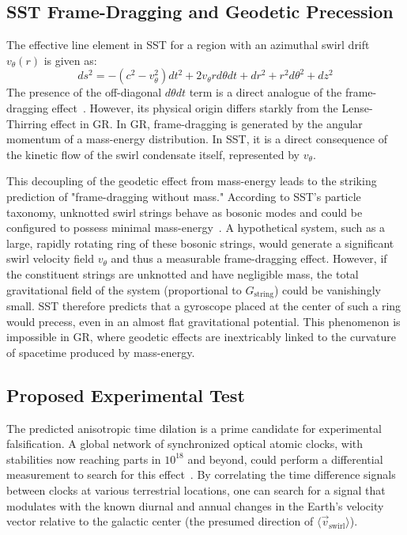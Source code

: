 \documentclass[11pt, a4paper]{article}
\begin{document}
    \subsection{SST Frame-Dragging and Geodetic Precession}

        The effective line element in SST for a region with an azimuthal swirl drift $v_{\theta}(r)$ is given as:
        \begin{equation}
        ds^{2}=-(c^{2}-v_{\theta}^{2})dt^{2}+2 v_{\theta}r d\theta dt+dr^{2}+r^{2}d\theta^{2}+dz^{2}
        \end{equation}
        The presence of the off-diagonal $d\theta dt$ term is a direct analogue of the frame-dragging effect~\cite{sst_canon}. However, its physical origin differs starkly from the Lense-Thirring effect in GR. In GR, frame-dragging is generated by the angular momentum of a mass-energy distribution. In SST, it is a direct consequence of the kinetic flow of the swirl condensate itself, represented by $v_{\theta}$.

        This decoupling of the geodetic effect from mass-energy leads to the striking prediction of "frame-dragging without mass." According to SST's particle taxonomy, unknotted swirl strings behave as bosonic modes and could be configured to possess minimal mass-energy~\cite{sst_canon}. A hypothetical system, such as a large, rapidly rotating ring of these bosonic strings, would generate a significant swirl velocity field $v_{\theta}$ and thus a measurable frame-dragging effect. However, if the constituent strings are unknotted and have negligible mass, the total gravitational field of the system (proportional to $G_{\text{string}}$) could be vanishingly small. SST therefore predicts that a gyroscope placed at the center of such a ring would precess, even in an almost flat gravitational potential. This phenomenon is impossible in GR, where geodetic effects are inextricably linked to the curvature of spacetime produced by mass-energy.

    \subsection{Proposed Experimental Test}

        The predicted anisotropic time dilation is a prime candidate for experimental falsification. A global network of synchronized optical atomic clocks, with stabilities now reaching parts in $10^{18}$ and beyond, could perform a differential measurement to search for this effect~\cite{clock_review1, clock_review2}. By correlating the time difference signals between clocks at various terrestrial locations, one can search for a signal that modulates with the known diurnal and annual changes in the Earth's velocity vector relative to the galactic center (the presumed direction of $\langle\vec{v}_{\text{swirl}}\rangle$).
\end{document}
